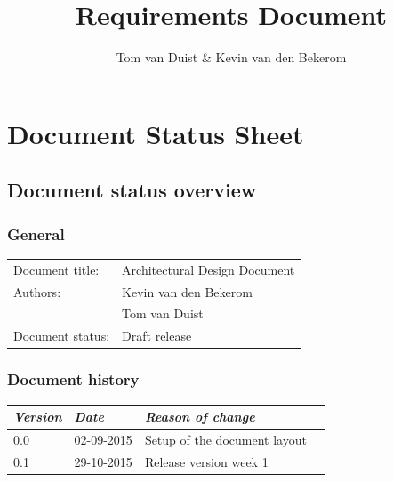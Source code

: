 

\title{Requirements Document}
\newcommand{\TitelAbbr}{RD}
\newcommand{\Version}{0.1}



\supervisors{}
\author{Tom van Duist \& Kevin van den Bekerom}





\maketitle


\tableofcontents

\chapter*{Document Status Sheet}
\section*{Document status overview}
\subsection*{General}
\begin{tabular}[!]{ll}
    Document title:     & Architectural Design Document\\
    Authors:           	& Kevin van den Bekerom \\ 
						& Tom van Duist \\
    Document status:    & Draft release\\
\end{tabular}

\subsection*{Document history}
\begin{tabular}[!]{|l|l|l|l|}
    \hline
    \emph{Version}    &   \emph{Date} &  \emph{Reason of change}\\
    \hline
    0.0 & 02-09-2015 &  Setup of the document layout\\    
    \hline
    0.1 & 29-10-2015 & Release version week 1 \\
    \hline
\end{tabular}

\clearpage


